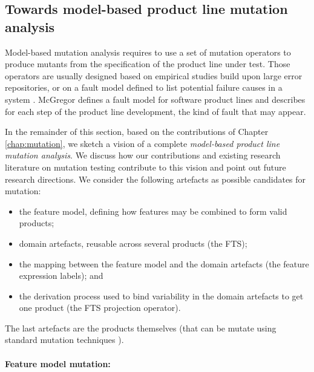 \subsection{Towards model-based product line mutation analysis}

\label{subsec:splmutationanalysis}

Model-based mutation analysis requires to use a set of mutation operators to produce mutants from the specification of the product line under test. Those operators are usually designed based on empirical studies build upon large error repositories, or on a fault model defined to list potential failure causes in a system \cite{Mathur2008}. McGregor \cite{McGregor2008} defines a fault model for software product lines and describes for each step of the product line development, the kind of fault that may appear. 

In the remainder of this section, based on the contributions of Chapter \ref{chap:mutation}, we sketch a vision of a complete \emph{model-based product line mutation analysis}. We discuss how our contributions and existing research literature on mutation testing contribute to this vision and point out future research directions. We consider the following artefacts as possible candidates for mutation:
\begin{itemize}
\item the feature model, defining how features may be combined to form valid products;
\item domain artefacts, reusable across several products (\ie the FTS);
\item the mapping between the feature model and the domain artefacts (\ie the feature expression labels); and 
\item the derivation process used to bind variability in the domain artefacts to get one product (\ie the FTS projection operator).
\end{itemize}
The last artefacts are the products themselves (that can be mutate using standard mutation techniques \cite{Jia2011a,Mathur2008}).

\paragraph{Feature model mutation:}

